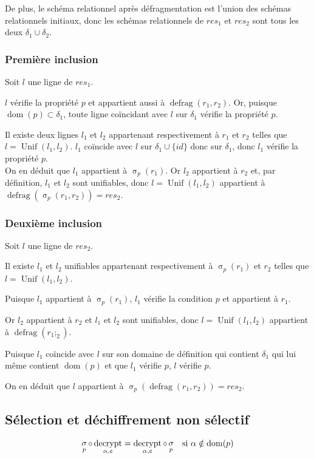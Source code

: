 \documentclass[french]{article}
\DeclareMathOperator{\sel}{\sigma}
\DeclareMathOperator{\defrag}{defrag}
\DeclareMathOperator{\decrypt}{decrypt}
\DeclareMathOperator{\dom}{dom}
\DeclareMathOperator{\uni}{Unif}
\newcommand\typeT[1]{\text{\ttfamily #1}}
\newcommand{\decryptArgs}[2]{\decrypt_{#1 , \typeT{#2}}}
\newcommand{\selP}{\sel_p}
\newcommand{\decryptCAlpha}{\decryptArgs{\alpha}{c}}
\newcommand{\cip}{\cup \{id\}}
\begin{document}
De plus, le schéma relationnel après défragmentation
est l'union des schémas relationnels initiaux,
donc les schémas relationnels de 
$res_1$ et $res_2$ sont tous les deux
$\delta_1 \cup \delta_2$.

\subsubsection*{Première inclusion}
Soit $l$ une ligne de $res_1$.

$l$ vérifie la propriété $p$
et appartient aussi à $\defrag(r_1, r_2)$.
Or, puisque $\dom(p) \subset \delta_1$,
toute ligne coïncidant avec $l$ sur 
$\delta_1$ vérifie la propriété $p$.

Il existe deux lignes $l_1$ et $l_2$
appartenant respectivement à 
$r_1$ et $r_2$ telles que
$l = \uni(l_1, l_2)$.
$l_1$ coïncide avec $l$ sur $\delta_1 \cip$
donc sur $\delta_1$, donc $l_1$ vérifie la propriété $p$. \\

On en déduit que $l_1$ appartient à $\selP(r_1)$.
Or $l_2$ appartient à $r_2$ et, par définition,
$l_1$ et $l_2$ sont unifiables,
donc $l = \uni(l_1, l_2)$ appartient
à $\defrag(\selP(r_1, r_2)) = res_2$.

\subsubsection*{Deuxième inclusion}
Soit $l$ une ligne de $res_2$.

Il existe $l_1$ et $l_2$ unifiables
appartenant respectivement à 
$\selP(r_1)$ et $r_2$ telles que
$l = \uni(l_1, l_2)$.

Puisque $l_1$ appartient à $\selP(r_1)$,
$l_1$ vérifie la condition $p$ et appartient à
$r_1$.

Or $l_2$ appartient à $r_2$ et 
$l_1$ et $l_2$ sont unifiables,
donc $l = \uni(l_1, l_2)$
appartient à $\defrag(r_1; _2)$.

Puisque $l_1$ coïncide avec $l$ sur son domaine de définition
qui contient    $\delta_1$ qui lui même contient $\dom(p)$ et que
$l_1$ vérifie $p$, $l$ vérifie $p$.

On en déduit que $l$ appartient à $\selP(\defrag(r_1, r_2)) = res_2$.

\subsection*{Sélection et déchiffrement non sélectif}
\begin{align}
\selP \circ \decryptCAlpha 
& = \decryptCAlpha \circ \selP
& \text{si $\alpha \notin \dom(p)$}
\end{align}
\end{document}
